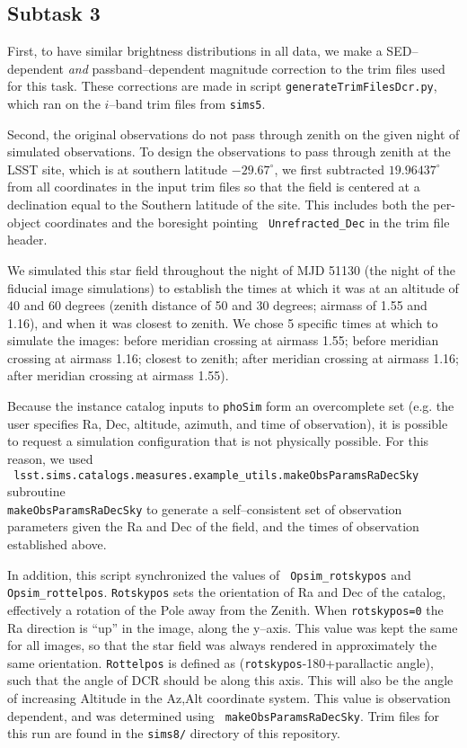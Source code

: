 \documentclass[prd, nofootinbib, floatfix, 11pt, tightenlines, times]{article}
\begin{document}
\begin{appendices}
\subsection{Subtask 3}

First, to have similar brightness distributions in all data, we make a
SED--dependent {\it and} passband--dependent magnitude correction to
the trim files used for this task.  These corrections are made in
script {\tt generateTrimFilesDcr.py}, which ran on the $i$--band trim
files from {\tt sims5}.

Second, the original observations do not pass through zenith on the
given night of simulated observations.  To design the observations to
pass through zenith at the LSST site, which is at southern latitude
$-29.67^{\circ}$, we first subtracted $19.96437^{\circ}$ from all
coordinates in the input trim files so that the field is centered at a
declination equal to the Southern latitude of the site.  This includes
both the per-object coordinates and the boresight pointing {\tt
  Unrefracted\_Dec} in the trim file header.

We simulated this star field throughout the night of MJD 51130 (the
night of the fiducial image simulations) to establish the times at
which it was at an altitude of 40 and 60 degrees (zenith distance of
50 and 30 degrees; airmass of 1.55 and 1.16), and when it was closest
to zenith.  We chose 5 specific times at which to simulate the images:
before meridian crossing at airmass 1.55; before meridian crossing at
airmass 1.16; closest to zenith; after meridian crossing at airmass
1.16; after meridian crossing at airmass 1.55).

Because the instance catalog inputs to {\tt phoSim} form an
overcomplete set (e.g. the user specifies Ra, Dec, altitude, azimuth,
and time of observation), it is possible to request a simulation
configuration that is not physically possible.  For this reason, we
used \\{\tt
  lsst.sims.catalogs.measures.example\_utils.makeObsParamsRaDecSky}
subroutine \\{\tt makeObsParamsRaDecSky} to generate a self--consistent
set of observation parameters given the Ra and Dec of the field, and
the times of observation established above.

In addition, this script synchronized the values of {\tt
  Opsim\_rotskypos} and {\tt Opsim\_rottelpos}.  {\tt Rotskypos} sets
the orientation of Ra and Dec of the catalog, effectively a rotation
of the Pole away from the Zenith.  When {\tt rotskypos=0} the Ra
direction is ``up'' in the image, along the y--axis.  This value was
kept the same for all images, so that the star field was always
rendered in approximately the same orientation.  {\tt Rottelpos} is
defined as ({\tt rotskypos}-180+parallactic angle), such that the
angle of DCR should be along this axis.  This will also be the angle
of increasing Altitude in the Az,Alt coordinate system.  This value is
observation dependent, and was determined using {\tt
  makeObsParamsRaDecSky}.  Trim files for this run are found in the
{\tt sims8/} directory of this repository.


\end{appendices}
\end{document}
